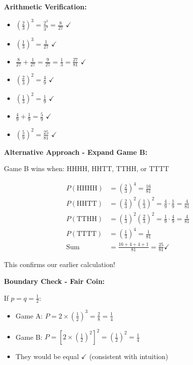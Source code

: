 \documentclass[]{article}
\begin{document}
\begin{verificationbox}
\textbf{Arithmetic Verification:}
\begin{itemize}[leftmargin=*]
    \item $\left(\frac{2}{3}\right)^3 = \frac{2^3}{3^3} = \frac{8}{27}$ $\checkmark$
    \item $\left(\frac{1}{3}\right)^3 = \frac{1}{27}$ $\checkmark$
    \item $\frac{8}{27} + \frac{1}{27} = \frac{9}{27} = \frac{1}{3} = \frac{27}{81}$ $\checkmark$
    \item $\left(\frac{2}{3}\right)^2 = \frac{4}{9}$ $\checkmark$
    \item $\left(\frac{1}{3}\right)^2 = \frac{1}{9}$ $\checkmark$
    \item $\frac{4}{9} + \frac{1}{9} = \frac{5}{9}$ $\checkmark$
    \item $\left(\frac{5}{9}\right)^2 = \frac{25}{81}$ $\checkmark$
\end{itemize}

\textbf{Alternative Approach - Expand Game B:}

Game B wins when: HHHH, HHTT, TTHH, or TTTT

\begin{align*}
P(\text{HHHH}) &= \left(\frac{2}{3}\right)^4 = \frac{16}{81}\\
P(\text{HHTT}) &= \left(\frac{2}{3}\right)^2\left(\frac{1}{3}\right)^2 = \frac{4}{9} \cdot \frac{1}{9} = \frac{4}{81}\\
P(\text{TTHH}) &= \left(\frac{1}{3}\right)^2\left(\frac{2}{3}\right)^2 = \frac{1}{9} \cdot \frac{4}{9} = \frac{4}{81}\\
P(\text{TTTT}) &= \left(\frac{1}{3}\right)^4 = \frac{1}{81}\\
\text{Sum} &= \frac{16 + 4 + 4 + 1}{81} = \frac{25}{81} \checkmark
\end{align*}

This confirms our earlier calculation!

\textbf{Boundary Check - Fair Coin:}

If $p = q = \frac{1}{2}$:
\begin{itemize}
    \item Game A: $P = 2 \times \left(\frac{1}{2}\right)^3 = \frac{2}{8} = \frac{1}{4}$
    \item Game B: $P = \left[2 \times \left(\frac{1}{2}\right)^2\right]^2 = \left(\frac{1}{2}\right)^2 = \frac{1}{4}$
    \item They would be equal $\checkmark$ (consistent with intuition)
\end{itemize}


\end{verificationbox}
\end{document}
